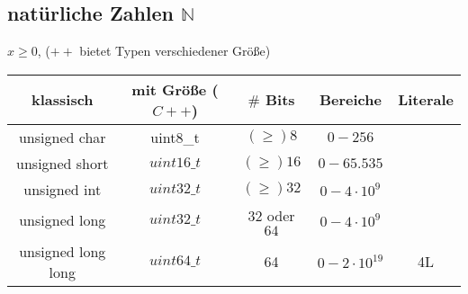 \documentclass{article}
\begin{document}
	\subsection{natürliche Zahlen $\mathbb{N}$}
	$x \geq 0$, ($++$ bietet Typen verschiedener Größe) \\

	\begin{tabular} {c|c|c|c|c}
		klassisch & mit Größe ($C++$) & $\#$ Bits & Bereiche & Literale \\ \hline
		unsigned char & uint8\_t & $(\geq) 8$ & $0-256$ & \\
		unsigned short & $uint16\_t$ & $(\geq) 16$ & $0-65.535$ & \\
		unsigned int & $uint32\_t$ & $(\geq) 32$ & $0-4\cdot 10^9$ & \\
		unsigned long & $uint32\_t$ & $32$ oder $64$ & $0-4\cdot 10^9$ & \\
		unsigned long long & $uint64\_t$ & 64 & $0-2\cdot 10^{19}$ & 4L \\
	\end{tabular}
	
\end{document}
